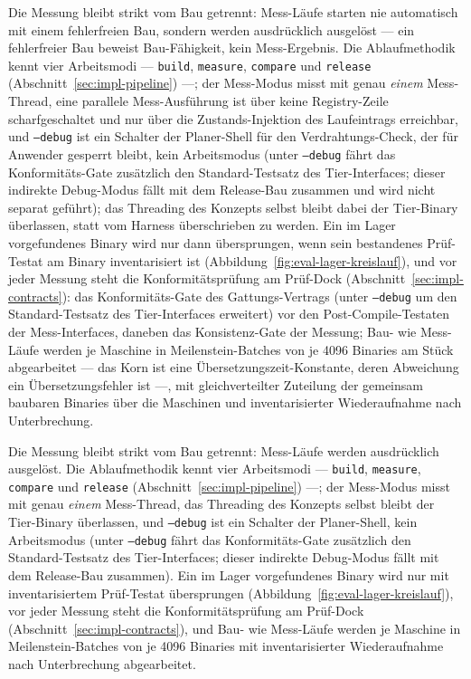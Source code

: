 \begin{nurlang}
Die Messung bleibt strikt vom Bau getrennt: Mess-Läufe starten nie automatisch mit einem fehlerfreien Bau,
sondern werden ausdrücklich ausgelöst --- ein fehlerfreier Bau beweist Bau-Fähigkeit, kein Mess-Ergebnis.
Die Ablaufmethodik kennt vier Arbeitsmodi --- \texttt{build}, \texttt{measure}, \texttt{compare} und
\texttt{release} (Abschnitt~\ref{sec:impl-pipeline}) ---; der Mess-Modus misst mit genau \emph{einem}
Mess-Thread, eine parallele Mess-Ausführung ist über keine Registry-Zeile scharfgeschaltet und nur über
die Zustands-Injektion des Laufeintrags erreichbar, und \texttt{--debug} ist ein Schalter der
Planer-Shell für den Verdrahtungs-Check, der für Anwender gesperrt bleibt, kein Arbeitsmodus (unter
\texttt{--debug} fährt das Konformitäts-Gate zusätzlich den Standard-Testsatz des Tier-Interfaces; dieser indirekte Debug-Modus
fällt mit dem Release-Bau zusammen und wird nicht separat geführt); das
Threading des Konzepts selbst bleibt dabei der Tier-Binary überlassen, statt vom Harness überschrieben
zu werden. Ein im Lager vorgefundenes Binary wird nur dann übersprungen, wenn sein bestandenes Prüf-Testat
am Binary inventarisiert ist (Abbildung~\ref{fig:eval-lager-kreislauf}), und vor jeder Messung steht
die Konformitätsprüfung am Prüf-Dock (Abschnitt~\ref{sec:impl-contracts}): das Konformitäts-Gate des
Gattungs-Vertrags (unter \texttt{--debug} um den Standard-Testsatz des Tier-Interfaces erweitert) vor den Post-Compile-Testaten
der Mess-Interfaces, daneben das Konsistenz-Gate der
Messung; Bau- wie Mess-Läufe werden je Maschine in Meilenstein-Batches von je 4096 Binaries am Stück
abgearbeitet --- das Korn ist eine Übersetzungszeit-Konstante, deren Abweichung ein Übersetzungsfehler
ist ---, mit gleichverteilter Zuteilung der gemeinsam baubaren Binaries über die Maschinen und
inventarisierter Wiederaufnahme nach Unterbrechung.
\end{nurlang}
\begin{nurkurz}
Die Messung bleibt strikt vom Bau getrennt: Mess-Läufe werden ausdrücklich ausgelöst. Die Ablaufmethodik
kennt vier Arbeitsmodi --- \texttt{build}, \texttt{measure}, \texttt{compare} und \texttt{release}
(Abschnitt~\ref{sec:impl-pipeline}) ---; der Mess-Modus misst mit genau \emph{einem} Mess-Thread, das
Threading des Konzepts selbst bleibt der Tier-Binary überlassen, und
\texttt{--debug} ist ein Schalter der Planer-Shell, kein Arbeitsmodus (unter \texttt{--debug} fährt das
Konformitäts-Gate zusätzlich den Standard-Testsatz des Tier-Interfaces; dieser indirekte Debug-Modus fällt mit dem Release-Bau
zusammen). Ein im Lager vorgefundenes Binary
wird nur mit inventarisiertem Prüf-Testat übersprungen
(Abbildung~\ref{fig:eval-lager-kreislauf}), vor jeder Messung steht die Konformitätsprüfung am Prüf-Dock
(Abschnitt~\ref{sec:impl-contracts}), und Bau- wie Mess-Läufe werden je Maschine in Meilenstein-Batches
von je 4096 Binaries mit inventarisierter Wiederaufnahme nach Unterbrechung abgearbeitet.
\end{nurkurz}

